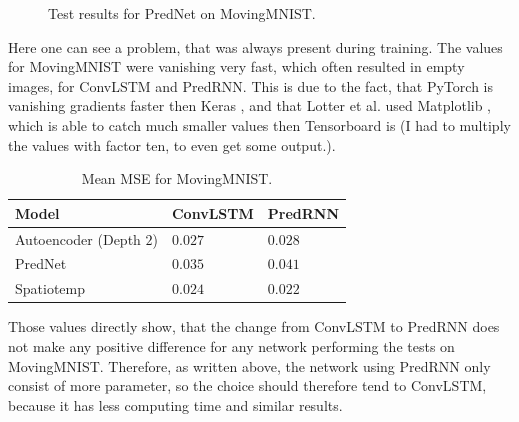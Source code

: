    \begin{figure}[H]
   \centering
   \qquad
   \qquad
   \caption{Test results for PredNet on MovingMNIST.}
   \label{figure::prednet_mnist_results}
  \end{figure}\noindent
  Here one can see a problem, that was always present during training. The values for MovingMNIST were vanishing very fast, which often resulted in empty images,
  for ConvLSTM and PredRNN. This is due to the fact, that PyTorch is vanishing gradients faster then Keras \cite{chollet2015}, and that Lotter et al. used 
  Matplotlib \cite{Hunter2007}, which is able to catch much smaller values then Tensorboard is (I had to multiply the values with factor ten, to even get some
  output.).
   \begin{table}[H]
    \begin{center}
     \begin{tabular}{| l | l | l |}\hline
      \textbf{Model} & \textbf{ConvLSTM} & \textbf{PredRNN} \\\hline
      Autoencoder (Depth $2$) & $0.027$ & $0.028$ \\\hline
      PredNet & $0.035$ & $0.041$ \\\hline
      Spatiotemp & $0.024$ & $0.022$ \\\hline
     \end{tabular}
    \end{center}
    \caption{Mean MSE for MovingMNIST.}
   \end{table}\noindent
   Those values directly show, that the change from ConvLSTM to PredRNN does not make any positive difference for any network performing the tests on MovingMNIST.
   Therefore, as written above, the network using PredRNN only consist of more parameter, so the choice should therefore tend to ConvLSTM, because it has less
   computing time and similar results.
   
